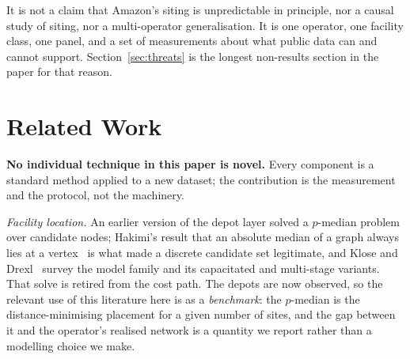 \documentclass[conference]{IEEEtran}
\begin{document}
It is not a claim that Amazon's siting is unpredictable in principle, nor a
causal study of siting, nor a multi-operator generalisation. It is one
operator, one facility class, one panel, and a set of measurements about what
public data can and cannot support. Section~\ref{sec:threats} is the longest
non-results section in the paper for that reason.

\section{Related Work}

\textbf{No individual technique in this paper is novel.} Every component is a
standard method applied to a new dataset; the contribution is the measurement
and the protocol, not the machinery.

\emph{Facility location.} An earlier version of the depot layer solved a
$p$-median problem over candidate nodes; Hakimi's result that an absolute
median of a graph always lies at a vertex~\cite{hakimi1964} is what made a
discrete candidate set legitimate, and Klose and Drexl~\cite{klosedrexl2005}
survey the model family and its capacitated and multi-stage variants. That
solve is retired from the cost path. The depots are now observed, so the
relevant use of this literature here is as a \emph{benchmark}: the $p$-median
is the distance-minimising placement for a given number of sites, and the gap
between it and the operator's realised network is a quantity we report rather
than a modelling choice we make.
\end{document}
